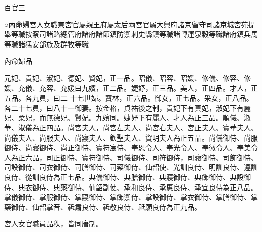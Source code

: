 
\begin{pinyinscope}

 百官三



 ○內命婦宮人女職東宮官屬親王府屬太后兩宮官屬大興府諸京留守司諸京城宮苑提舉等職按察司諸路總管府諸府諸節鎮防禦刺史縣鎮等職諸轉運泉穀等職諸府鎮兵馬等職諸猛安部族及群牧等職



 內命婦品



 元妃、貴妃、淑妃、德妃、賢妃，正一品。昭儀、昭容、昭媛、修儀、修容、修媛、充儀、充容、充媛曰九嬪，正二品。婕妤，正三品。美人，正四品。才人，正五品。各九員，曰二
 十七世婦。寶林，正六品。御女，正七品。采女，正八品。各二十七員，曰八十一御妻。按金格，貞祐後之制，貴妃下有真妃，淑妃下有麗妃、柔妃，而無德妃、賢妃。九嬪同。婕妤下有麗人、才人為正三品。順儀、淑華、淑儀為正四品。尚宮夫人，尚宮左夫人、尚宮右夫人、宮正夫人、寶華夫人、尚儀夫人、尚服夫人、尚寢夫人、欽聖夫人、資明夫人為正五品。尚儀御侍、尚服御侍、尚寢御侍、尚正御侍、寶符宸侍、奉恩令人、奉光令人、奉徽令人、奉美令人為正六品，司正御侍、寶符御侍、司儀御侍、司符御侍，司寢御侍、司飾御侍、司設御侍、司衣御侍、司膳御侍、司藥御侍、仙韶使、光訓良侍、明訓良侍、遵訓良侍、從訓良侍為正七品。典儀御侍、典膳御侍、典寢御侍、典飾御侍、典設御侍、典衣御侍、典藥御侍、仙韶副使、承和良侍、承惠良侍、承宜良侍為正八品。掌儀御侍、掌服御侍、掌寢御侍、掌飾禦侍、掌設御侍、掌衣御侍、掌膳御侍、掌藥御侍、仙韶掌音、祗肅良侍、祗敬良侍、祗願良侍為正九品。



 宮人女官職員品秩，皆同唐制。




\end{pinyinscope}
